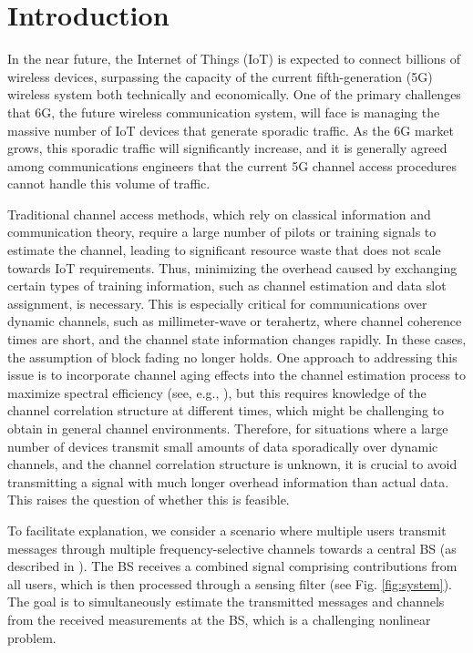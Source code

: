 \documentclass[conference,10pt]{IEEEtran}
\theoremstyle{remark}
\theoremstyle{plain}
\theoremstyle{definition}
\theoremstyle{remark}
\begin{document}
\section{Introduction}
In the near future, the Internet of Things (IoT) is expected to connect billions of wireless devices, surpassing the capacity of the current fifth-generation (5G) wireless system both technically and economically. One of the primary challenges that 6G, the future wireless communication system, will face is managing the massive number of IoT devices that generate sporadic traffic. As the 6G market grows, this sporadic traffic will significantly increase, and it is generally agreed among communications engineers that the current 5G channel access procedures cannot handle this volume of traffic.

Traditional channel access methods, which rely on classical information and communication theory, require a large number of pilots or training signals to estimate the channel, leading to significant resource waste that does not scale towards IoT requirements. Thus, minimizing the overhead caused by exchanging certain types of training information, such as channel estimation and data slot assignment, is necessary. This is especially critical for communications over dynamic channels, such as millimeter-wave or terahertz, where channel coherence times are short, and the channel state information changes rapidly. In these cases, the assumption of block fading no longer holds. One approach to addressing this issue is to incorporate channel aging effects into the channel estimation process to maximize spectral efficiency (see, e.g., \cite{fodor2023optimizing}), but this requires knowledge of the channel correlation structure at different times, which might be challenging to obtain in general channel environments. Therefore, for situations where a large number of devices transmit small amounts of data sporadically over dynamic channels, and the channel correlation structure is unknown, it is crucial to avoid transmitting a signal with much longer overhead information than actual data. This raises the question of whether this is feasible.




 


To facilitate explanation, we consider a scenario where multiple users transmit messages through multiple frequency-selective channels towards a central \ac{BS} (as described in \cite[Eq. 19]{sayeed2010wireless}). The \ac{BS} receives a combined signal comprising contributions from all users, which is then processed through a sensing filter (see Fig. \ref{fig:system}). The goal is to simultaneously estimate the transmitted messages and channels from the received measurements at the \ac{BS}, which is a challenging nonlinear problem. 
\end{document}
